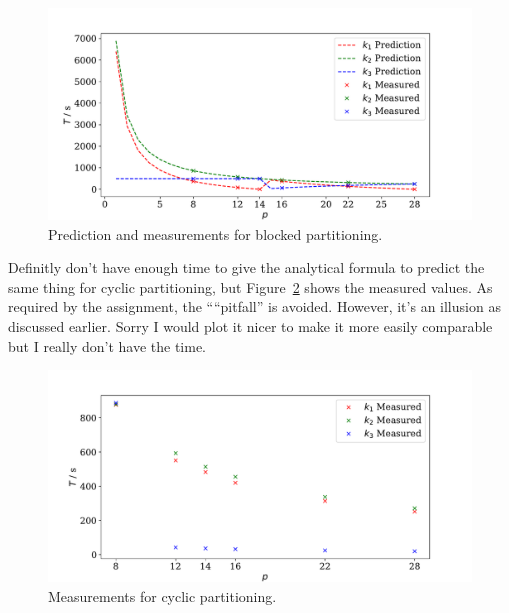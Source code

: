 \documentclass[a4paper, 11pt]{article}
\begin{document}
\begin{figure}
  \centering
  \includegraphics[width=\textwidth]{../codebreaker/plot/block.pdf}
  \caption{Prediction and measurements for blocked partitioning.}
  \label{fig:block}
\end{figure}

Definitly don't have enough time to give the analytical formula to predict the
same thing for cyclic partitioning, but Figure~\ref{fig:cyclic} shows the
measured values. As required by the assignment, the ````pitfall'' is avoided.
However, it's an illusion as discussed earlier. Sorry I would plot it nicer to
make it more easily comparable but I really don't have the time.

\begin{figure}
  \centering
  \includegraphics[width=\textwidth]{../codebreaker/plot/cyclic.pdf}
  \caption{Measurements for cyclic partitioning.}
  \label{fig:cyclic}
\end{figure}
\end{document}
